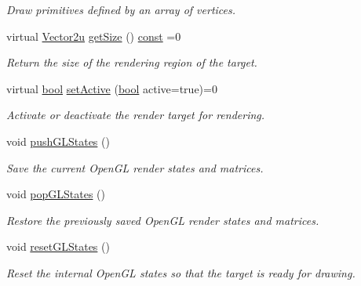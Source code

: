 \begin{DoxyCompactItemize}
\begin{DoxyCompactList}\small\item\em Draw primitives defined by an array of vertices. \end{DoxyCompactList}\item 
virtual \hyperlink{namespacesf_a41039649eb65ea7646e2b97cfe124b4f}{Vector2u} \hyperlink{classsf_1_1_render_target_a2e5ade2457d9fb4c4907ae5b3d9e94a5}{get\-Size} () \hyperlink{term__entry_8h_a57bd63ce7f9a353488880e3de6692d5a}{const} =0
\begin{DoxyCompactList}\small\item\em Return the size of the rendering region of the target. \end{DoxyCompactList}\item 
virtual \hyperlink{term__entry_8h_a002004ba5d663f149f6c38064926abac}{bool} \hyperlink{classsf_1_1_render_target_a4438c5885b142d070a769a7a868b0fdc}{set\-Active} (\hyperlink{term__entry_8h_a002004ba5d663f149f6c38064926abac}{bool} active=true)=0
\begin{DoxyCompactList}\small\item\em Activate or deactivate the render target for rendering. \end{DoxyCompactList}\item 
void \hyperlink{classsf_1_1_render_target_a8d1998464ccc54e789aaf990242b47f7}{push\-G\-L\-States} ()
\begin{DoxyCompactList}\small\item\em Save the current Open\-G\-L render states and matrices. \end{DoxyCompactList}\item 
void \hyperlink{classsf_1_1_render_target_ad5a98401113df931ddcd54c080f7aa8e}{pop\-G\-L\-States} ()
\begin{DoxyCompactList}\small\item\em Restore the previously saved Open\-G\-L render states and matrices. \end{DoxyCompactList}\item 
void \hyperlink{classsf_1_1_render_target_aac7504990d27dada4bfe3c7866920765}{reset\-G\-L\-States} ()
\begin{DoxyCompactList}\small\item\em Reset the internal Open\-G\-L states so that the target is ready for drawing. \end{DoxyCompactList}\end{DoxyCompactItemize}

